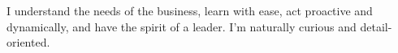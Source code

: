 


\small
I understand the needs of the business, learn with ease, act proactive and dynamically, 
and have the spirit of a leader. I'm naturally curious and detail-oriented.
